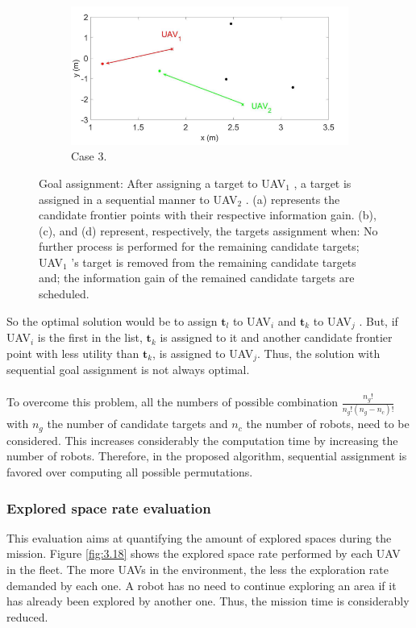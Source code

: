 \documentclass[11pt,openany]{book}
\begin{document}
\begin{figure}[H]
\begin{subfigure}[H]{0.6\linewidth}
        \label{fig:3.17c}
    \end{subfigure}
    \begin{subfigure}[H]{0.6\linewidth}
        \includegraphics[width=\linewidth]{assets/3_17_c.png}
        \caption{{Case 3.}}
        \label{fig:3.17d}
    \end{subfigure}
    \caption{Goal assignment: After assigning a target to UAV$_1$ , a target is assigned in a sequential manner to UAV$_2$ . (a) represents the candidate frontier points with their respective information gain. (b), (c), and (d) represent, respectively, the targets assignment when: No further process is performed for the remaining candidate targets; UAV$_1$ ’s target is removed from the remaining candidate targets and; the information gain of the remained candidate targets are scheduled.}
    \label{fig:3.17}
\end{figure}
So the optimal solution would be to assign $\mathbf{t}_l$ to UAV$_i$ and $\mathbf{t}_k$ to UAV$_j$ . But, if UAV$_i$ is the first in the list, $\mathbf{t}_k$ is assigned to it and another candidate frontier point with less utility than $\mathbf{t}_k$, is assigned to UAV$_j$. Thus, the solution with sequential goal assignment is not always optimal.\\\\
To overcome this problem, all the numbers of possible combination $\frac{n_g!}{n_g!(n_g-n_c)!}$ with $n_g$ the number of candidate targets and $n_c$ the number of robots, need to be considered. This increases considerably the computation time by increasing the number of robots. Therefore, in the proposed algorithm, sequential assignment is favored over computing all possible permutations.
\subsubsection{Explored space rate evaluation}
This evaluation aims at quantifying the amount of explored spaces during the mission. Figure \ref{fig:3.18} shows the explored space rate performed by each UAV in the ﬂeet. The more UAVs in the environment, the less the exploration rate demanded by each one. A robot has no need to continue exploring an area if it has already been explored by another one. Thus, the mission time is considerably reduced.
\end{document}
